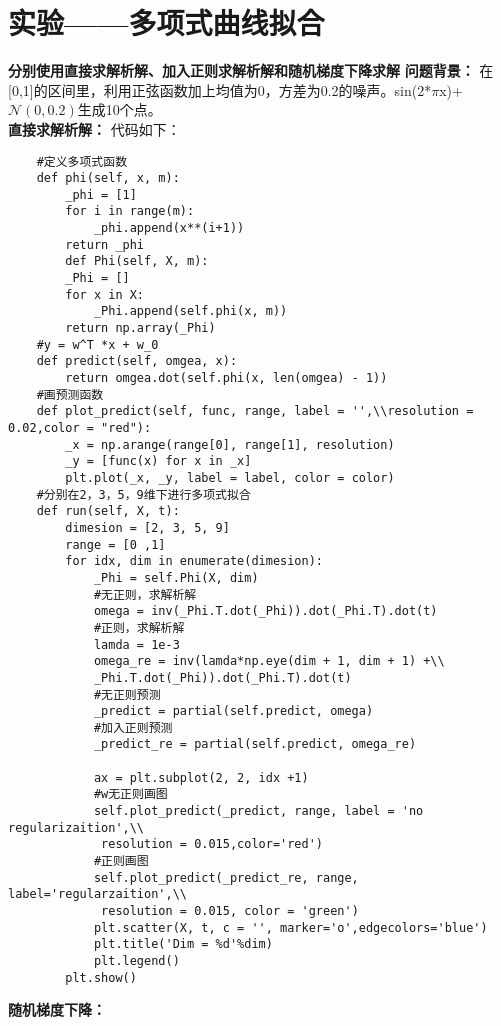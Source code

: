 \documentclass{ctexart}
\begin{document}
    \section{实验——多项式曲线拟合}
    \textbf{分别使用直接求解析解、加入正则求解析解和随机梯度下降求解}
    \textbf{问题背景：} 在[0,1]的区间里，利用正弦函数加上均值为0，方差为0.2的噪声。sin(2*$\pi$x)+$\mathcal N(0, 0.2)$生成10个点。\\
    \textbf{直接求解析解：} 代码如下： \\
    \begin{lstlisting}
    #定义多项式函数
    def phi(self, x, m):
        _phi = [1]
        for i in range(m):
            _phi.append(x**(i+1))
        return _phi
        def Phi(self, X, m):
        _Phi = []
        for x in X:
            _Phi.append(self.phi(x, m))
        return np.array(_Phi)
    #y = w^T *x + w_0
    def predict(self, omgea, x):
        return omgea.dot(self.phi(x, len(omgea) - 1))
    #画预测函数
    def plot_predict(self, func, range, label = '',\\resolution = 0.02,color = "red"):
        _x = np.arange(range[0], range[1], resolution)
        _y = [func(x) for x in _x]
        plt.plot(_x, _y, label = label, color = color)
    #分别在2，3，5，9维下进行多项式拟合
    def run(self, X, t):
        dimesion = [2, 3, 5, 9]
        range = [0 ,1]
        for idx, dim in enumerate(dimesion):
            _Phi = self.Phi(X, dim)
            #无正则，求解析解
            omega = inv(_Phi.T.dot(_Phi)).dot(_Phi.T).dot(t)
            #正则，求解析解
            lamda = 1e-3
            omega_re = inv(lamda*np.eye(dim + 1, dim + 1) +\\
            _Phi.T.dot(_Phi)).dot(_Phi.T).dot(t)
            #无正则预测
            _predict = partial(self.predict, omega)
            #加入正则预测
            _predict_re = partial(self.predict, omega_re)

            ax = plt.subplot(2, 2, idx +1)
            #w无正则画图
            self.plot_predict(_predict, range, label = 'no regularizaition',\\
             resolution = 0.015,color='red')
            #正则画图
            self.plot_predict(_predict_re, range, label='regularzaition',\\
             resolution = 0.015, color = 'green')
            plt.scatter(X, t, c = '', marker='o',edgecolors='blue')
            plt.title('Dim = %d'%dim)
            plt.legend()
        plt.show()
    \end{lstlisting}
    \textbf{随机梯度下降：}\\
\end{document}

